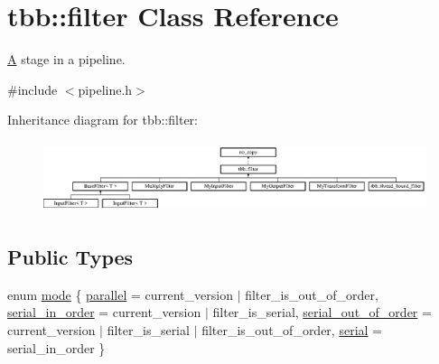 \hypertarget{classtbb_1_1filter}{}\section{tbb\+:\+:filter Class Reference}
\label{classtbb_1_1filter}


\hyperlink{structA}{A} stage in a pipeline.  




{\ttfamily \#include $<$pipeline.\+h$>$}

Inheritance diagram for tbb\+:\+:filter\+:\begin{figure}[H]
\begin{center}
\leavevmode
\includegraphics[height=2.091503cm]{classtbb_1_1filter}
\end{center}
\end{figure}
\subsection*{Public Types}
\begin{DoxyCompactItemize}
\item 
enum \hyperlink{classtbb_1_1filter_a8145c736bafcf0b401d50bf1a1df9125}{mode} \{ \hyperlink{classtbb_1_1filter_a8145c736bafcf0b401d50bf1a1df9125a2604b539ec56a2d9ea6234a39f3d872a}{parallel} = current\+\_\+version $\vert$ filter\+\_\+is\+\_\+out\+\_\+of\+\_\+order, 
\hyperlink{classtbb_1_1filter_a8145c736bafcf0b401d50bf1a1df9125a9bac158682f44168d98270c556b3a635}{serial\+\_\+in\+\_\+order} = current\+\_\+version $\vert$ filter\+\_\+is\+\_\+serial, 
\hyperlink{classtbb_1_1filter_a8145c736bafcf0b401d50bf1a1df9125ad83029eabf74f69cd459092e0c7f8639}{serial\+\_\+out\+\_\+of\+\_\+order} = current\+\_\+version $\vert$ filter\+\_\+is\+\_\+serial $\vert$ filter\+\_\+is\+\_\+out\+\_\+of\+\_\+order, 
\hyperlink{classtbb_1_1filter_a8145c736bafcf0b401d50bf1a1df9125a979bc85071cfc4704b06fcf0364e6df3}{serial} = serial\+\_\+in\+\_\+order
 \}
\end{DoxyCompactItemize}
